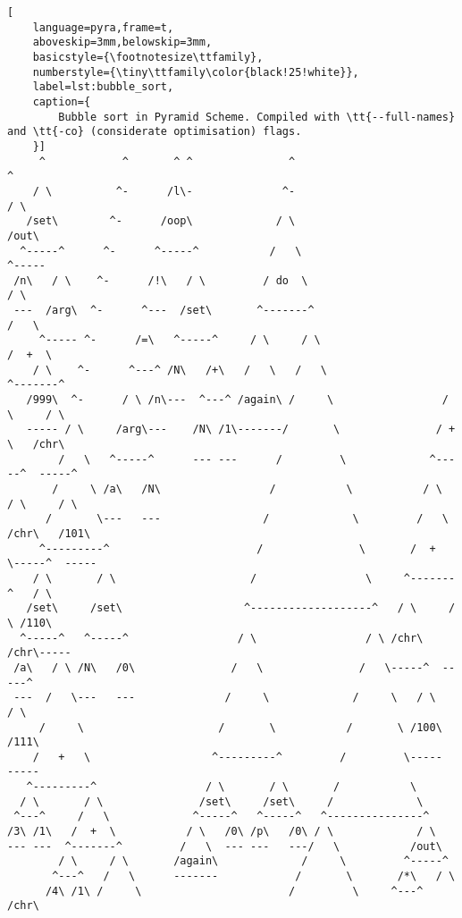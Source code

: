 \documentclass[aip,jcp,reprint,footinbib]{revtex4-1}
\let\tt\texttt
\begin{document}
\onecolumngrid
\begin{lstlisting}[
    language=pyra,frame=t,
    aboveskip=3mm,belowskip=3mm,
    basicstyle={\footnotesize\ttfamily},
    numberstyle={\tiny\ttfamily\color{black!25!white}},
    label=lst:bubble_sort,
    caption={
        Bubble sort in Pyramid Scheme. Compiled with \tt{--full-names} and \tt{-co} (considerate optimisation) flags.
    }]
     ^            ^       ^ ^               ^                               ^
    / \          ^-      /l\-              ^-                              / \
   /set\        ^-      /oop\             / \                             /out\
  ^-----^      ^-      ^-----^           /   \                           ^-----
 /n\   / \    ^-      /!\   / \         / do  \                         / \
 ---  /arg\  ^-      ^---  /set\       ^-------^                       /   \
     ^----- ^-      /=\   ^-----^     / \     / \                     /  +  \
    / \    ^-      ^---^ /N\   /+\   /   \   /   \                   ^-------^
   /999\  ^-      / \ /n\---  ^---^ /again\ /     \                 / \     / \
   ----- / \     /arg\---    /N\ /1\-------/       \               / + \   /chr\
        /   \   ^-----^      --- ---      /         \             ^-----^  -----^
       /     \ /a\   /N\                 /           \           / \   / \     / \
      /       \---   ---                /             \         /   \ /chr\   /101\
     ^---------^                       /               \       /  +  \-----^  -----
    / \       / \                     /                 \     ^-------^   / \
   /set\     /set\                   ^-------------------^   / \     / \ /110\
  ^-----^   ^-----^                 / \                 / \ /chr\   /chr\-----
 /a\   / \ /N\   /0\               /   \               /   \-----^  -----^
 ---  /   \---   ---              /     \             /     \   / \     / \
     /     \                     /       \           /       \ /100\   /111\
    /   +   \                   ^---------^         /         \-----   -----
   ^---------^                 / \       / \       /           \
  / \       / \               /set\     /set\     /             \
 ^---^     /   \             ^-----^   ^-----^   ^---------------^
/3\ /1\   /  +  \           / \   /0\ /p\   /0\ / \             / \
--- ---  ^-------^         /   \  --- ---   ---/   \           /out\
        / \     / \       /again\             /     \         ^-----^
       ^---^   /   \      -------            /       \       /*\   / \
      /4\ /1\ /     \                       /         \     ^---^ /chr\

\end{lstlisting}
\end{document}
